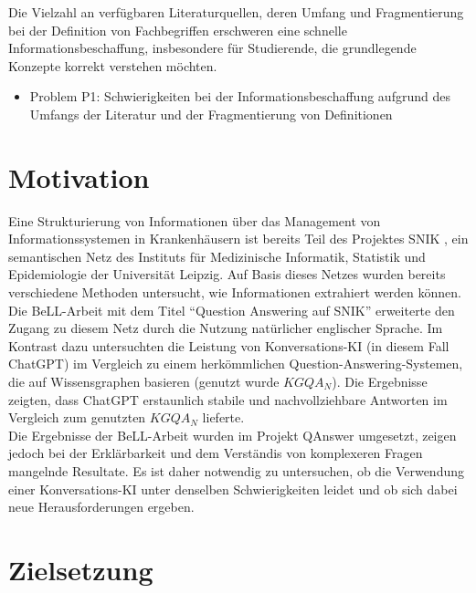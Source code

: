 Die Vielzahl an verfügbaren Literaturquellen, deren Umfang und Fragmentierung bei der Definition von Fachbegriffen
erschweren eine schnelle Informationsbeschaffung, insbesondere für Studierende, die grundlegende Konzepte korrekt verstehen möchten. \\

\begin{itemize}
  \item Problem P1: Schwierigkeiten bei der Informationsbeschaffung aufgrund des Umfangs der Literatur und der Fragmentierung von Definitionen
\end{itemize}

\section{Motivation}

Eine Strukturierung von Informationen über das Management von Informationssystemen in Krankenhäusern ist bereits Teil des Projektes SNIK \citep{semantischesnetz}, 
ein semantischen Netz des Instituts für Medizinische Informatik, Statistik und Epidemiologie der Universität Leipzig.
Auf Basis dieses Netzes wurden bereits verschiedene Methoden untersucht, wie Informationen extrahiert werden können.\\

Die BeLL-Arbeit mit dem Titel \enquote{Question Answering auf SNIK} \citep{hannesbell} erweiterte den Zugang zu diesem Netz durch die Nutzung natürlicher englischer Sprache. 
Im Kontrast dazu untersuchten \citet{chatgpt_qas} die Leistung von Konversations-KI (in diesem Fall ChatGPT) im Vergleich zu einem herkömmlichen Question-Answering-Systemen, die auf Wissensgraphen basieren (genutzt wurde $KGQA_N$).
Die Ergebnisse zeigten, dass ChatGPT erstaunlich stabile und nachvollziehbare Antworten im Vergleich zum genutzten $KGQA_N$ lieferte.\\

Die Ergebnisse der BeLL-Arbeit wurden im Projekt QAnswer \citep{qanswer} umgesetzt, zeigen jedoch bei der Erklärbarkeit und dem Verständis von komplexeren Fragen mangelnde Resultate. 
Es ist daher notwendig zu untersuchen, ob die Verwendung einer Konversations-KI unter denselben Schwierigkeiten leidet und ob sich dabei neue Herausforderungen ergeben.

\section{Zielsetzung}\label{sec:zielsetzung}

